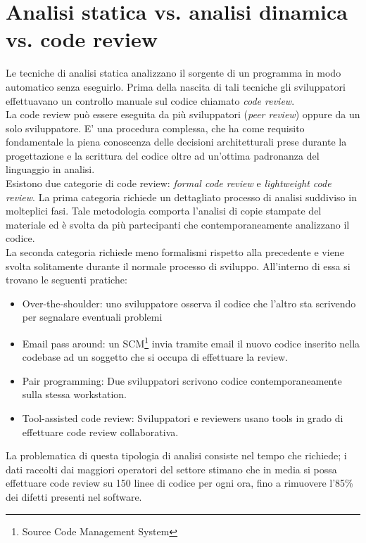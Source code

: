 \section{Analisi statica vs. analisi dinamica vs. code review}
Le tecniche di analisi statica analizzano il sorgente di un programma in modo automatico senza eseguirlo. Prima della nascita di tali tecniche gli sviluppatori effettuavano un controllo manuale sul codice chiamato \emph{code review}.\\

La code review può essere eseguita da più sviluppatori (\emph{peer review}) oppure da un solo sviluppatore. E' una procedura complessa, che ha come requisito fondamentale la piena conoscenza delle decisioni architetturali prese durante la progettazione e la scrittura del codice oltre ad un'ottima padronanza del linguaggio in analisi. \\
Esistono due categorie di code review: \emph{formal code review} e \emph{lightweight code review}. La prima categoria richiede un dettagliato processo di analisi suddiviso in molteplici fasi. Tale metodologia comporta l'analisi di copie stampate del materiale ed è svolta da più partecipanti che contemporaneamente analizzano il codice.\\
La seconda categoria richiede meno formalismi rispetto alla precedente e viene svolta solitamente durante il normale processo di sviluppo. All'interno di essa si trovano le seguenti pratiche:
\begin{itemize}
\item Over-the-shoulder: uno sviluppatore osserva il codice che l'altro sta scrivendo per segnalare eventuali problemi
\item Email pass around: un SCM\footnote{Source Code Management System} invia tramite email il nuovo codice inserito nella codebase ad un soggetto che si occupa di effettuare la review.
\item Pair programming: Due sviluppatori scrivono codice contemporaneamente sulla stessa workstation. 
\item Tool-assisted code review: Sviluppatori e reviewers usano tools in grado di effettuare code review collaborativa.
\end{itemize}
La problematica di questa tipologia di analisi consiste nel tempo che richiede; i dati raccolti dai maggiori operatori del settore stimano che in media si possa effettuare code review su 150 linee di codice per ogni ora, fino a rimuovere l'85\% dei difetti presenti nel software.

